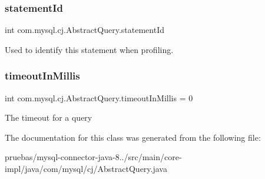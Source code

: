 \subsubsection{\texorpdfstring{statement\+Id}{statementId}}
{\footnotesize\ttfamily int com.\+mysql.\+cj.\+Abstract\+Query.\+statement\+Id\hspace{0.3cm}{\ttfamily [protected]}}

Used to identify this statement when profiling. \mbox{\label{classcom_1_1mysql_1_1cj_1_1_abstract_query_ad17e5fb0c9a8a7c413116831638c8651}} 
\subsubsection{\texorpdfstring{timeout\+In\+Millis}{timeoutInMillis}}
{\footnotesize\ttfamily int com.\+mysql.\+cj.\+Abstract\+Query.\+timeout\+In\+Millis = 0\hspace{0.3cm}{\ttfamily [protected]}}

The timeout for a query 

The documentation for this class was generated from the following file\+:\begin{DoxyCompactItemize}
\item 
pruebas/mysql-\/connector-\/java-\/8../src/main/core-\/impl/java/com/mysql/cj/Abstract\+Query.\+java\end{DoxyCompactItemize}
